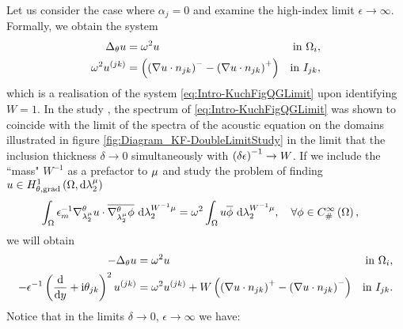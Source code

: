 Let us consider the case where $\alpha_j=0$ and examine the high-index limit $\epsilon\rightarrow\infty$.
Formally, we obtain the system
\begin{subequations}
	\begin{align*}
		\Delta_\theta u 
		&= \omega^2 u 
		&\text{in } \Omega_i, \\
		\omega^2 u^{(jk)}
		&= \left( \left( \nabla u\cdot n_{jk} \right)^- - \left( \nabla u\cdot n_{jk} \right)^+ \right)
		&\text{in } I_{jk},
	\end{align*}
\end{subequations}
which is a realisation of the system \eqref{eq:Intro-KuchFigQGLimit} upon identifying $W=1$.
In the study \cite{figotin1998spectral}, the spectrum of \eqref{eq:Intro-KuchFigQGLimit} was shown to coincide with the limit of the spectra of the acoustic equation on the domains illustrated in figure  \ref{fig:Diagram_KF-DoubleLimitStudy} in the limit that the inclusion thickness $\delta\rightarrow0$ simultaneously with $\left( \delta\epsilon \right)^{-1}\rightarrow W$.
If we include the ``mass" $W^{-1}$ as a prefactor to $\mu$ and study the problem of finding $u\in H^1_{\theta, \mathrm{grad}}\left( \Omega, \mathrm{d}\lambda_2^{\mu} \right)$
\begin{align*}
	\int_{\Omega} \epsilon_m^{-1}\nabla^{\theta}_{\lambda_2^{\mu}}u\cdot\overline{\nabla^{\theta}_{\lambda_2^{\mu}}\phi}  \ \mathrm{d}\lambda_2^{W^{-1}\mu}
	&= \omega^2 \int_{\Omega} u\overline{\phi}  \ \mathrm{d}\lambda_2^{W^{-1}\mu}, \quad\forall\phi\in C^{\infty}_{\#}\left( \Omega \right),
\end{align*}
we will obtain
\begin{subequations}
	\begin{align*}
		-\Delta_\theta u 
		&= \omega^2 u 
		&\text{in } \Omega_i, \\
		- \epsilon^{-1}\left( \dfrac{\mathrm{d}}{\mathrm{d}y} + \mathrm{i}\theta_{jk} \right)^2u^{(jk)}  
		&= \omega^2 u^{(jk)} + W\left( \left( \nabla u\cdot n_{jk} \right)^+ - \left( \nabla u\cdot n_{jk} \right)^- \right)
		&\text{in } I_{jk}.
	\end{align*}
\end{subequations}
Notice that in the limits $\delta\rightarrow0$, $\epsilon\rightarrow\infty$ we have:
